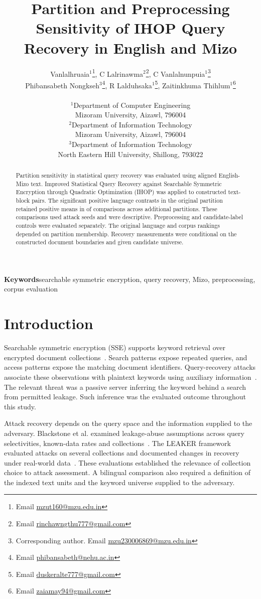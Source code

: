 \documentclass[12pt]{article}
\title{Partition and Preprocessing Sensitivity of IHOP Query Recovery in English and Mizo}
\author{Vanlalhruaia$^{1}$\thanks{Email \href{mailto:mzut160@mzu.edu.in}{mzut160@mzu.edu.in}},
C Lalrinawma$^{2}$\thanks{Email \href{mailto:rinchawngthu777@gmail.com}{rinchawngthu777@gmail.com}},
C Vanlalnunpuia$^{1}$\thanks{Corresponding author. Email \href{mailto:mzu230006869@mzu.edu.in}{mzu230006869@mzu.edu.in}}\\
Phibansabeth Nongkseh$^{3}$\thanks{Email \href{mailto:phibansabeth@nehu.ac.in}{phibansabeth@nehu.ac.in}},
R Lalduhsaka$^{1}$\thanks{Email \href{mailto:duskeralte777@gmail.com}{duskeralte777@gmail.com}},
Zaitinkhuma Thihlum$^{1}$\thanks{Email \href{mailto:zaiamay94@gmail.com}{zaiamay94@gmail.com}}\\[6pt]
\parbox{0.95\textwidth}{\centering\normalsize
$^{1}$Department of Computer Engineering\\Mizoram University, Aizawl, 796004\\[3pt]
$^{2}$Department of Information Technology\\Mizoram University, Aizawl, 796004\\[3pt]
$^{3}$Department of Information Technology\\North Eastern Hill University, Shillong, 793022}}
\date{}
\begin{document}
\maketitle
\begin{abstract}
Partition sensitivity in statistical query recovery was evaluated using aligned English-Mizo text. Improved Statistical Query Recovery against Searchable Symmetric Encryption through Quadratic Optimization (IHOP) was applied to \ProductionPairs{} constructed text-block pairs. The \LanguageSignificant{} significant positive language contrasts in the original partition retained positive means in \SensitivityPositiveDirections{} of \SensitivityDirectionCount{} comparisons across \SensitivityPartitions{} additional partitions. These comparisons used \SensitivitySeeds{} attack seeds and were descriptive. Preprocessing and candidate-label controls were evaluated separately. The original language and corpus rankings depended on partition membership. Recovery measurements were conditional on the constructed document boundaries and given candidate universe.
\end{abstract}
\noindent\textbf{Keywords}\quad searchable symmetric encryption, query recovery, Mizo, preprocessing, corpus evaluation

\section{Introduction}
Searchable symmetric encryption (SSE) supports keyword retrieval over encrypted document collections~\cite{curtmola}. Search patterns expose repeated queries, and access patterns expose the matching document identifiers. Query-recovery attacks associate these observations with plaintext keywords using auxiliary information~\cite{islam,blackstone}. The relevant threat was a passive server inferring the keyword behind a search from permitted leakage. Such inference was the evaluated outcome throughout this study.

Attack recovery depends on the query space and the information supplied to the adversary. Blackstone et al. examined leakage-abuse assumptions across query selectivities, known-data rates and collections~\cite{blackstone}. The LEAKER framework evaluated attacks on several collections and documented changes in recovery under real-world data~\cite{leaker}. These evaluations established the relevance of collection choice to attack assessment. A bilingual comparison also required a definition of the indexed text units and the keyword universe supplied to the adversary.
\end{document}

